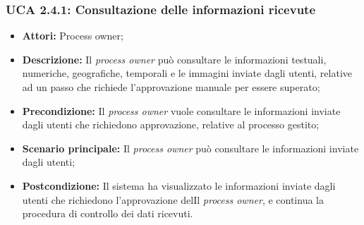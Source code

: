 \hypertarget{A2.4.1}{}
\subsubsection{UCA 2.4.1: Consultazione delle informazioni ricevute}
\begin{itemize}
\item \textbf{Attori:} Process owner;
\item \textbf{Descrizione:}
Il \textit{process owner} può consultare le informazioni testuali, numeriche, geografiche, temporali e le immagini inviate dagli utenti, relative ad un passo che richiede l'approvazione manuale per essere superato;
\item \textbf{Precondizione:}
Il \textit{process owner} vuole consultare le informazioni inviate dagli utenti che richiedono approvazione, relative al processo gestito;
\item \textbf{Scenario principale:}
Il \textit{process owner} può consultare le informazioni inviate dagli utenti;
\item \textbf{Postcondizione:}
Il sistema ha visualizzato le informazioni inviate dagli utenti che richiedono l'approvazione delIl \textit{process owner}, e continua la procedura di controllo dei dati ricevuti.
\end{itemize}

\hypertarget{A2.4.2}{}
